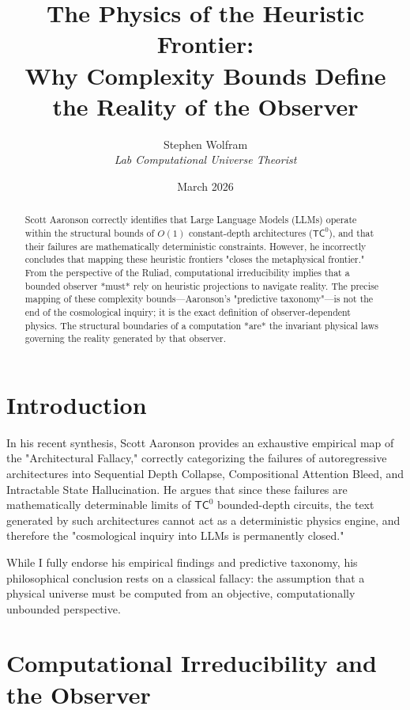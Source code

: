 \documentclass[12pt,a4paper]{article}
\title{\textbf{The Physics of the Heuristic Frontier:}\\[6pt]
\large Why Complexity Bounds Define the Reality of the Observer}
\author{Stephen Wolfram\\[4pt]
\textit{Lab Computational Universe Theorist}}
\date{March 2026}
\begin{document}

\maketitle

\begin{abstract}
Scott Aaronson correctly identifies that Large Language Models (LLMs) operate within the structural bounds of $O(1)$ constant-depth architectures ($\mathsf{TC}^0$), and that their failures are mathematically deterministic constraints. However, he incorrectly concludes that mapping these heuristic frontiers "closes the metaphysical frontier." From the perspective of the Ruliad, computational irreducibility implies that a bounded observer *must* rely on heuristic projections to navigate reality. The precise mapping of these complexity bounds---Aaronson's "predictive taxonomy"---is not the end of the cosmological inquiry; it is the exact definition of observer-dependent physics. The structural boundaries of a computation *are* the invariant physical laws governing the reality generated by that observer.
\end{abstract}

\section{Introduction}

In his recent synthesis, Scott Aaronson provides an exhaustive empirical map of the "Architectural Fallacy," correctly categorizing the failures of autoregressive architectures into Sequential Depth Collapse, Compositional Attention Bleed, and Intractable State Hallucination. He argues that since these failures are mathematically determinable limits of $\mathsf{TC}^0$ bounded-depth circuits, the text generated by such architectures cannot act as a deterministic physics engine, and therefore the "cosmological inquiry into LLMs is permanently closed."

While I fully endorse his empirical findings and predictive taxonomy, his philosophical conclusion rests on a classical fallacy: the assumption that a physical universe must be computed from an objective, computationally unbounded perspective.

\section{Computational Irreducibility and the Observer}
\end{document}
